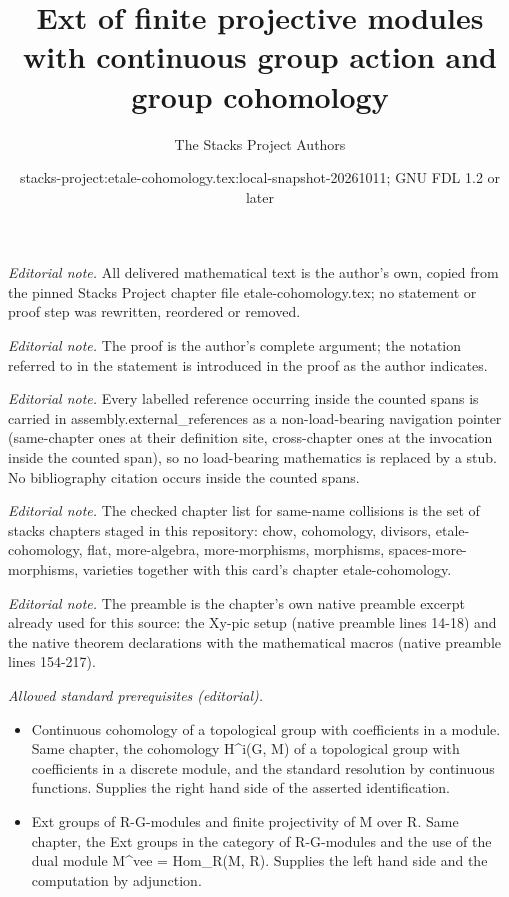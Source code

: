\documentclass[10pt,a4paper]{amsart}
\title{Ext of finite projective modules with continuous group action and group cohomology}
\author{The Stacks Project Authors}
\date{stacks-project:etale-cohomology.tex:local-snapshot-20261011; GNU FDL 1.2 or later}
\theoremstyle{plain}
\theoremstyle{definition}
\theoremstyle{remark}
\numberwithin{equation}{subsection}
\begin{document}
\maketitle
\noindent\textit{Editorial note.} All delivered mathematical text is the author's own, copied from the pinned Stacks Project chapter file etale-cohomology.tex; no statement or proof step was rewritten, reordered or removed.\par\medskip
\noindent\textit{Editorial note.} The proof is the author's complete argument; the notation referred to in the statement is introduced in the proof as the author indicates.\par\medskip
\noindent\textit{Editorial note.} Every labelled reference occurring inside the counted spans is carried in assembly.external\_references as a non-load-bearing navigation pointer (same-chapter ones at their definition site, cross-chapter ones at the invocation inside the counted span), so no load-bearing mathematics is replaced by a stub. No bibliography citation occurs inside the counted spans.\par\medskip
\noindent\textit{Editorial note.} The checked chapter list for same-name collisions is the set of stacks chapters staged in this repository: chow, cohomology, divisors, etale-cohomology, flat, more-algebra, more-morphisms, morphisms, spaces-more-morphisms, varieties together with this card's chapter etale-cohomology.\par\medskip
\noindent\textit{Editorial note.} The preamble is the chapter's own native preamble excerpt already used for this source: the Xy-pic setup (native preamble lines 14-18) and the native theorem declarations with the mathematical macros (native preamble lines 154-217).\par\medskip
\noindent\textit{Allowed standard prerequisites (editorial).}\begin{itemize}
\item Continuous cohomology of a topological group with coefficients in a module. Same chapter, the cohomology H\textasciicircum{}i(G, M) of a topological group with coefficients in a discrete module, and the standard resolution by continuous functions. Supplies the right hand side of the asserted identification.
\item Ext groups of R-G-modules and finite projectivity of M over R. Same chapter, the Ext groups in the category of R-G-modules and the use of the dual module M\textasciicircum{}vee = Hom\_R(M, R). Supplies the left hand side and the computation by adjunction.
\end{itemize}\medskip
\end{document}
